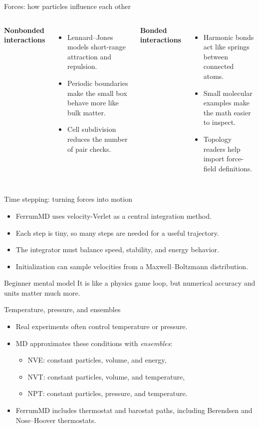 \documentclass[aspectratio=169]{beamer}
\begin{document}
\begin{frame}{Forces: how particles influence each other}
\begin{columns}[T]
\textbf{Nonbonded interactions}
\begin{itemize}
  \item Lennard--Jones models short-range attraction and repulsion.
  \item Periodic boundaries make the small box behave more like bulk matter.
  \item Cell subdivision reduces the number of pair checks.
\end{itemize}

\textbf{Bonded interactions}
\begin{itemize}
  \item Harmonic bonds act like springs between connected atoms.
  \item Small molecular examples make the math easier to inspect.
  \item Topology readers help import force-field definitions.
\end{itemize}
\end{columns}
\end{frame}

\begin{frame}{Time stepping: turning forces into motion}
\begin{itemize}
  \item FerrumMD uses velocity-Verlet as a central integration method.
  \item Each step is tiny, so many steps are needed for a useful trajectory.
  \item The integrator must balance speed, stability, and energy behavior.
  \item Initialization can sample velocities from a Maxwell--Boltzmann distribution.
\end{itemize}
\begin{block}{Beginner mental model}
It is like a physics game loop, but numerical accuracy and units matter much more.
\end{block}
\end{frame}

\begin{frame}{Temperature, pressure, and ensembles}
\begin{itemize}
  \item Real experiments often control temperature or pressure.
  \item MD approximates these conditions with \emph{ensembles}:
  \begin{itemize}
    \item NVE: constant particles, volume, and energy,
    \item NVT: constant particles, volume, and temperature,
    \item NPT: constant particles, pressure, and temperature.
  \end{itemize}
  \item FerrumMD includes thermostat and barostat paths, including Berendsen and Nose--Hoover thermostats.
\end{itemize}
\end{frame}
\end{document}
